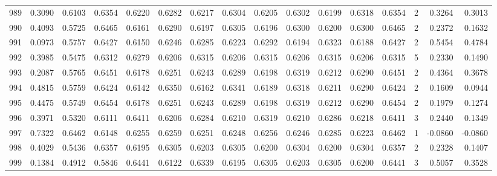 \begin{tabular}{lrrrrrrrrrrrrrrr}
989 &      0.3090 &  0.6103 &  0.6354 &  0.6220 &  0.6282 &  0.6217 &  0.6304 &  0.6205 &  0.6302 &  0.6199 &   0.6318 &     0.6354 &      2 &                    0.3264 &                     0.3013 \\
990 &      0.4093 &  0.5725 &  0.6465 &  0.6161 &  0.6290 &  0.6197 &  0.6305 &  0.6196 &  0.6300 &  0.6200 &   0.6300 &     0.6465 &      2 &                    0.2372 &                     0.1632 \\
991 &      0.0973 &  0.5757 &  0.6427 &  0.6150 &  0.6246 &  0.6285 &  0.6223 &  0.6292 &  0.6194 &  0.6323 &   0.6188 &     0.6427 &      2 &                    0.5454 &                     0.4784 \\
992 &      0.3985 &  0.5475 &  0.6312 &  0.6279 &  0.6206 &  0.6315 &  0.6206 &  0.6315 &  0.6206 &  0.6315 &   0.6206 &     0.6315 &      5 &                    0.2330 &                     0.1490 \\
993 &      0.2087 &  0.5765 &  0.6451 &  0.6178 &  0.6251 &  0.6243 &  0.6289 &  0.6198 &  0.6319 &  0.6212 &   0.6290 &     0.6451 &      2 &                    0.4364 &                     0.3678 \\
994 &      0.4815 &  0.5759 &  0.6424 &  0.6142 &  0.6350 &  0.6162 &  0.6341 &  0.6189 &  0.6318 &  0.6211 &   0.6290 &     0.6424 &      2 &                    0.1609 &                     0.0944 \\
995 &      0.4475 &  0.5749 &  0.6454 &  0.6178 &  0.6251 &  0.6243 &  0.6289 &  0.6198 &  0.6319 &  0.6212 &   0.6290 &     0.6454 &      2 &                    0.1979 &                     0.1274 \\
996 &      0.3971 &  0.5320 &  0.6111 &  0.6411 &  0.6206 &  0.6284 &  0.6210 &  0.6319 &  0.6210 &  0.6286 &   0.6218 &     0.6411 &      3 &                    0.2440 &                     0.1349 \\
997 &      0.7322 &  0.6462 &  0.6148 &  0.6255 &  0.6259 &  0.6251 &  0.6248 &  0.6256 &  0.6246 &  0.6285 &   0.6223 &     0.6462 &      1 &                   -0.0860 &                    -0.0860 \\
998 &      0.4029 &  0.5436 &  0.6357 &  0.6195 &  0.6305 &  0.6203 &  0.6305 &  0.6200 &  0.6304 &  0.6200 &   0.6304 &     0.6357 &      2 &                    0.2328 &                     0.1407 \\
999 &      0.1384 &  0.4912 &  0.5846 &  0.6441 &  0.6122 &  0.6339 &  0.6195 &  0.6305 &  0.6203 &  0.6305 &   0.6200 &     0.6441 &      3 &                    0.5057 &                     0.3528 \\
\bottomrule
\end{tabular}
